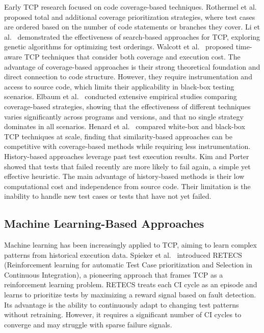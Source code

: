 \documentclass[10pt,journal,compsoc]{IEEEtran}
\begin{document}
Early TCP research focused on code coverage-based techniques.
Rothermel et al.~\cite{rothermel2001prioritizing} proposed total and additional
coverage prioritization strategies, where test cases are ordered based on the
number of code statements or branches they cover.
Li et al.~\cite{li2007search} demonstrated the effectiveness of search-based
approaches for TCP, exploring genetic algorithms for optimizing test orderings.
Walcott et al.~\cite{walcott2006timeaware} proposed time-aware TCP techniques
that consider both coverage and execution cost.
The advantage of coverage-based approaches is their strong theoretical foundation
and direct connection to code structure. However, they require instrumentation
and access to source code, which limits their applicability in black-box testing
scenarios.
Elbaum et al.~\cite{elbaum2002test} conducted extensive empirical studies comparing
coverage-based strategies, showing that the effectiveness of different techniques
varies significantly across programs and versions, and that no single strategy
dominates in all scenarios.
Henard et al.~\cite{henard2016comparing} compared white-box and black-box TCP
techniques at scale, finding that similarity-based approaches can be competitive
with coverage-based methods while requiring less instrumentation.
History-based approaches leverage past test execution results.
Kim and Porter~\cite{kim2002history} showed that tests that failed
recently are more likely to fail again, a simple yet effective heuristic.
The main advantage of history-based methods is their low computational cost and
independence from source code. Their limitation is the inability to handle new
test cases or tests that have not yet failed.

\subsection{Machine Learning-Based Approaches}

Machine learning has been increasingly applied to TCP, aiming to learn complex
patterns from historical execution data.
Spieker et al.~\cite{spieker2017reinforcement} introduced RETECS
(Reinforcement learning for automatic Test Case prioritization and Selection
in Continuous Integration), a pioneering approach that frames TCP as a
reinforcement learning problem. RETECS treats each CI cycle as an episode
and learns to prioritize tests by maximizing a reward signal based on fault
detection. Its advantage is the ability to continuously adapt to changing test
patterns without retraining. However, it requires a significant number of CI
cycles to converge and may struggle with sparse failure signals.
\end{document}
